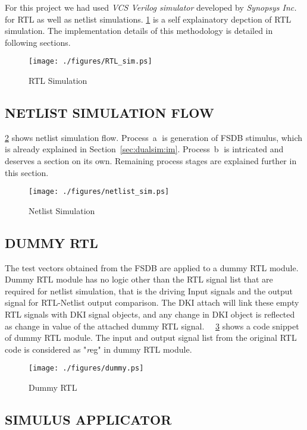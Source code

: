 For this project we had used {\it VCS Verilog simulator} developed by {\it Synopsys Inc.} for RTL as well as netlist simulations. \figurename{\ref{fig:RTL_sim.eps}} is a self explainatory depction of RTL simulation. The implementation details of this methodology is detailed in following sections. 

\begin{figure}[h]
\centering
\texttt{[image: ./figures/RTL\_sim.ps]}
\caption{RTL Simulation}
\label{fig:RTL_sim.eps}
\end{figure}


\subsection{NETLIST SIMULATION FLOW}
\figurename{\ref{fig:netlist_sim.ps}} shows netlist simulation flow. Process~\textcircled{a} is generation of FSDB stimulus, which is already explained in Section~\ref{sec:dualsim:im}. Process~\textcircled{b} is intricated and deserves a section on its own. Remaining process stages are explained further in this section.

\begin{figure}[h]
\centering
\texttt{[image: ./figures/netlist\_sim.ps]}
\caption{Netlist Simulation}
\label{fig:netlist_sim.ps}
\end{figure}


\subsection{DUMMY RTL}
The test vectors obtained from the FSDB are applied to a dummy RTL module. Dummy RTL module has no logic other than the RTL signal list that are required for netlist simulation, that is the driving Input signals and the output signal for RTL-Netlist output comparison. The DKI attach will link these empty RTL signals with DKI signal objects, and any change in DKI object is reflected as change in value of the attached dummy RTL signal. ~\figurename{~\ref{fig:dummy.ps}} shows a code snippet of dummy RTL module. The input and output signal list from the original RTL code is considered as "{\emph reg}" in dummy RTL module.


\begin{figure}[h]
\centering
\texttt{[image: ./figures/dummy.ps]}
\caption{Dummy RTL}
\label{fig:dummy.ps}
\end{figure}

\subsection{SIMULUS APPLICATOR}

